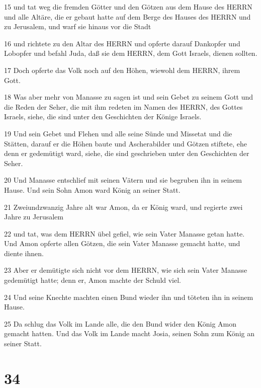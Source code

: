 \par 15 und tat weg die fremden Götter und den Götzen aus dem Hause des HERRN und alle Altäre, die er gebaut hatte auf dem Berge des Hauses des HERRN und zu Jerusalem, und warf sie hinaus vor die Stadt
\par 16 und richtete zu den Altar des HERRN und opferte darauf Dankopfer und Lobopfer und befahl Juda, daß sie dem HERRN, dem Gott Israels, dienen sollten.
\par 17 Doch opferte das Volk noch auf den Höhen, wiewohl dem HERRN, ihrem Gott.
\par 18 Was aber mehr von Manasse zu sagen ist und sein Gebet zu seinem Gott und die Reden der Seher, die mit ihm redeten im Namen des HERRN, des Gottes Israels, siehe, die sind unter den Geschichten der Könige Israels.
\par 19 Und sein Gebet und Flehen und alle seine Sünde und Missetat und die Stätten, darauf er die Höhen baute und Ascherabilder und Götzen stiftete, ehe denn er gedemütigt ward, siehe, die sind geschrieben unter den Geschichten der Seher.
\par 20 Und Manasse entschlief mit seinen Vätern und sie begruben ihn in seinem Hause. Und sein Sohn Amon ward König an seiner Statt.
\par 21 Zweiundzwanzig Jahre alt war Amon, da er König ward, und regierte zwei Jahre zu Jerusalem
\par 22 und tat, was dem HERRN übel gefiel, wie sein Vater Manasse getan hatte. Und Amon opferte allen Götzen, die sein Vater Manasse gemacht hatte, und diente ihnen.
\par 23 Aber er demütigte sich nicht vor dem HERRN, wie sich sein Vater Manasse gedemütigt hatte; denn er, Amon machte der Schuld viel.
\par 24 Und seine Knechte machten einen Bund wieder ihn und töteten ihn in seinem Hause.
\par 25 Da schlug das Volk im Lande alle, die den Bund wider den König Amon gemacht hatten. Und das Volk im Lande macht Josia, seinen Sohn zum König an seiner Statt.

\chapter{34}

